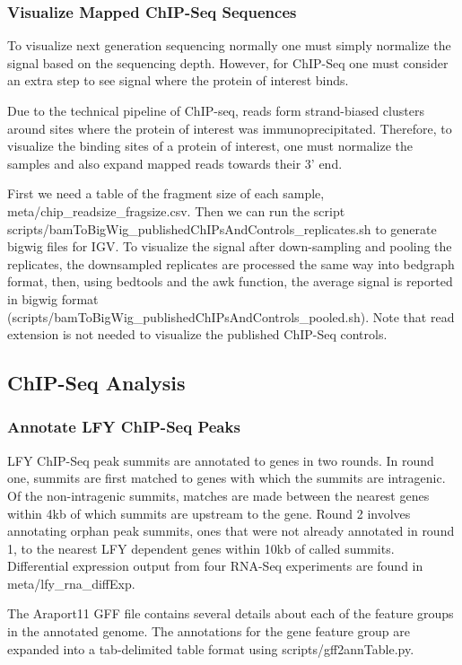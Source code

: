 \documentclass{article}
\begin{document}
\begin{sloppypar}
\subsubsection{Visualize Mapped ChIP-Seq Sequences}
To visualize next generation sequencing normally one must simply normalize the signal based on the sequencing depth. However, for ChIP-Seq one must consider an extra step to see signal where the protein of interest binds.

Due to the technical pipeline of ChIP-seq, reads form strand-biased clusters around sites where the protein of interest was immunoprecipitated. Therefore, to visualize the binding sites of a protein of interest, one must normalize the samples and also expand mapped reads towards their 3' end.

First we need a table of the fragment size of each sample, {\selectfont meta/chip\_readsize\_fragsize.csv}. Then we can run the script {\selectfont scripts/bamToBigWig\_publishedChIPsAndControls\_replicates.sh} to generate bigwig files for IGV. To visualize the signal after down-sampling and pooling the replicates, the downsampled replicates are processed the same way into bedgraph format, then, using bedtools and the awk function, the average signal is reported in bigwig format ({\selectfont scripts/bamToBigWig\_publishedChIPsAndControls\_pooled.sh}). Note that read extension is not needed to visualize the published ChIP-Seq controls. 

\subsection{ChIP-Seq Analysis}
\subsubsection{Annotate LFY ChIP-Seq Peaks}
LFY ChIP-Seq peak summits are annotated to genes in two rounds. In round one, summits are first matched to genes with which the summits are intragenic. Of the non-intragenic summits, matches are made between the nearest genes within 4kb of which summits are upstream to the gene. Round 2 involves annotating orphan peak summits, ones that were not already annotated in round 1, to the nearest LFY dependent genes within 10kb of called summits. Differential expression output from four RNA-Seq experiments are found in {\selectfont meta/lfy\_rna\_diffExp}.

The Araport11 GFF file contains several details about each of the feature groups in the annotated genome. The annotations for the gene feature group are expanded into a tab-delimited table format using {\selectfont scripts/gff2annTable.py}.


\end{sloppypar}
\end{document}
